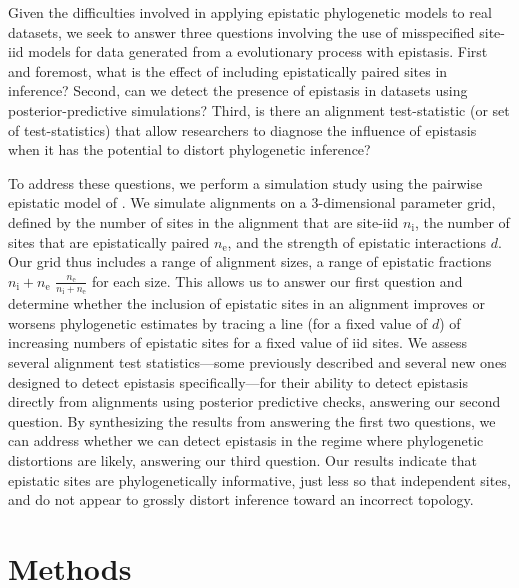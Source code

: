 \documentclass[11pt]{article}
\newcommand{\amcomment}[1]{{\color{blue}{(\textbf{AM's comment:} #1)}}}
\begin{document}
Given the difficulties involved in applying epistatic phylogenetic models to real datasets, we seek to answer three questions involving the use of misspecified site-iid models for data generated from a evolutionary process with epistasis.
First and foremost, what is the effect of including epistatically paired sites in inference?
Second, can we detect the presence of epistasis in datasets using posterior-predictive simulations?
Third, is there an alignment test-statistic (or set of test-statistics) that allow researchers to diagnose the influence of epistasis when it has the potential to distort phylogenetic inference?

To address these questions, we perform a simulation study using the pairwise epistatic model of \cite{nasrallah2013phylogenetic}.
We simulate alignments on a 3-dimensional parameter grid, defined by the number of sites in the alignment that are site-iid $n_{\mathrm{i}}$, the number of sites that are epistatically paired $n_{\mathrm{e}}$, and the strength of epistatic interactions $d$.
Our grid thus includes a range of alignment sizes, a range of epistatic fractions $n_{\mathrm{i}}+n_{\mathrm{e}}$ $\frac{n_{\mathrm{e}}}{n_{\mathrm{i}}+n_{\mathrm{e}}}$ for each size.
This allows us to answer our first question and determine whether the inclusion of epistatic sites in an alignment improves or worsens phylogenetic estimates by tracing a line (for a fixed value of $d$) of increasing numbers of epistatic sites for a fixed value of iid sites.
We assess several alignment test statistics---some previously described and several new ones designed to detect epistasis specifically---for their ability to detect epistasis directly from alignments using posterior predictive checks, answering our second question.
By synthesizing the results from answering the first two questions, we can address whether we can detect epistasis in the regime where phylogenetic distortions are likely, answering our third question.
Our results indicate that epistatic sites are phylogenetically informative, just less so that independent sites, and do not appear to grossly distort inference toward an incorrect topology.

\section*{Methods\label{sec:methods}}
\end{document}
